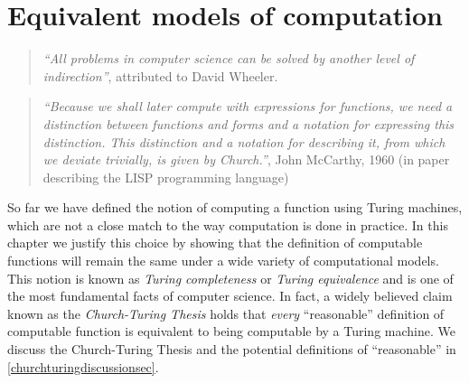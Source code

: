 \chapter{Equivalent models of computation}\label{chapequivalentmodels}


\begin{quote}
\emph{``All problems in computer science can be solved by another level
of indirection''}, attributed to David Wheeler.
\end{quote}

\begin{quote}
\emph{``Because we shall later compute with expressions for functions,
we need a distinction between functions and forms and a notation for
expressing this distinction. This distinction and a notation for
describing it, from which we deviate trivially, is given by Church.''},
John McCarthy, 1960 (in paper describing the LISP programming language)
\end{quote}

So far we have defined the notion of computing a function using Turing
machines, which are not a close match to the way computation is done in
practice. In this chapter we justify this choice by showing that the
definition of computable functions will remain the same under a wide
variety of computational models. This notion is known as \emph{Turing
completeness} or \emph{Turing equivalence} and is one of the most
fundamental facts of computer science. In fact, a widely believed claim
known as the \emph{Church-Turing Thesis} holds that \emph{every}
``reasonable'' definition of computable function is equivalent to being
computable by a Turing machine. We discuss the Church-Turing Thesis and
the potential definitions of ``reasonable'' in
\cref{churchturingdiscussionsec}.


